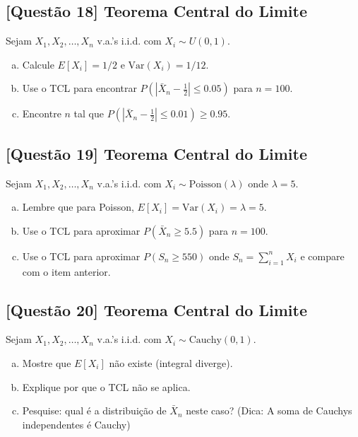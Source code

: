 \documentclass[12pt,a4paper]{article}
\begin{document}
\subsection*{[Questão 18] Teorema Central do Limite}

Sejam $X_1, X_2, \ldots, X_n$ v.a.'s i.i.d. com $X_i \sim U(0, 1)$.

\begin{enumerate}[(a)]
    \item Calcule $E[X_i] = 1/2$ e $\text{Var}(X_i) = 1/12$.
    \item Use o TCL para encontrar $P\left(\left|\bar{X}_n - \frac{1}{2}\right| \leq 0.05\right)$ para $n = 100$.
    \item Encontre $n$ tal que $P\left(\left|\bar{X}_n - \frac{1}{2}\right| \leq 0.01\right) \geq 0.95$.
\end{enumerate}

\subsection*{[Questão 19] Teorema Central do Limite}

Sejam $X_1, X_2, \ldots, X_n$ v.a.'s i.i.d. com $X_i \sim \text{Poisson}(\lambda)$ onde $\lambda = 5$.

\begin{enumerate}[(a)]
    \item Lembre que para Poisson, $E[X_i] = \text{Var}(X_i) = \lambda = 5$.
    \item Use o TCL para aproximar $P(\bar{X}_n \geq 5.5)$ para $n = 100$.
    \item Use o TCL para aproximar $P(S_n \geq 550)$ onde $S_n = \sum_{i=1}^n X_i$ e compare com o item anterior.
\end{enumerate}

\subsection*{[Questão 20] Teorema Central do Limite}

Sejam $X_1, X_2, \ldots, X_n$ v.a.'s i.i.d. com $X_i \sim \text{Cauchy}(0, 1)$.

\begin{enumerate}[(a)]
    \item Mostre que $E[X_i]$ não existe (integral diverge).
    \item Explique por que o TCL não se aplica.
    \item Pesquise: qual é a distribuição de $\bar{X}_n$ neste caso? (Dica: A soma de Cauchys independentes é Cauchy)
\end{enumerate}
\end{document}
